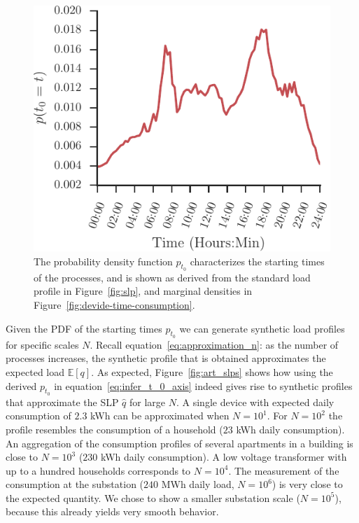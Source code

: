 \documentclass[conference]{IEEEtran}
\begin{document}
\begin{figure}[b!]
\centering
\includegraphics[width=0.7\columnwidth]{figures/t_0.pdf}
\caption{The probability density function $p_{t_0}$ characterizes the starting times of the processes, and is shown as derived from the standard load profile in Figure~\ref{fig:slp}, and marginal densities in Figure~\ref{fig:devide-time-consumption}.}
\vspace{-0.4cm}
\label{fig:distribution_t_0}
\end{figure}



Given the PDF of the starting times $p_{t_0}$ we can generate synthetic load profiles for specific scales $N$. Recall equation~\eqref{eq:approximation_n}: as the number of processes increases, the synthetic profile that is obtained  approximates the expected load $\mathbb{E}[q]$. As expected, Figure~\ref{fig:art_slps} shows how using the derived $p_{t_0}$ in equation~\eqref{eq:infer_t_0_axis} indeed gives rise to synthetic profiles that approximate the SLP $\hat{q}$ for large $N$. A single device with expected daily consumption of $2.3$ kWh can be approximated when $N=10^1$. For $N=10^2$ the profile resembles the consumption of a household ($23$ kWh daily consumption). An aggregation of the consumption profiles of several apartments in a building is close to $N=10^3$ ($230$ kWh daily consumption). A low voltage transformer with up to a hundred households corresponds to $N=10^4$. The measurement of the consumption at the substation ($240$ MWh daily load, $N=10^6$) is very close to the expected quantity. We chose to show a smaller substation scale ($N=10^5$), because this already yields very smooth behavior.
\end{document}
